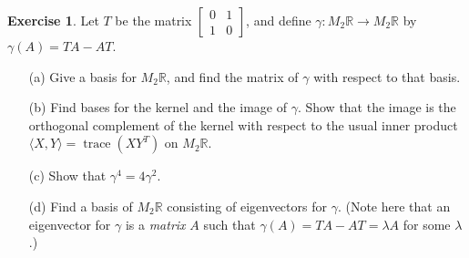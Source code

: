 \documentclass{amsart}
\newcommand{\R}         {{\mathbb{R}}}
\newcommand{\trc}       {\operatorname{trace}}
\newcommand{\bbm}       {\left[\begin{matrix}}
\newcommand{\ebm}       {\end{matrix}\right]}
\newcommand{\gm}        {\gamma}
\newcommand{\lm}        {\lambda}
\newcommand{\ip}[1]     {\langle #1\rangle}
\renewcommand{\:}       {\colon}
\theoremstyle{definition}
\newtheorem{exercise}{Exercise}[section]
\begin{document}
\begin{exercise}
 Let $T$ be the matrix $\bbm 0&1\\1&0\ebm$, and define
 $\gm\:M_2\R\to M_2\R$ by $\gm(A)=TA-AT$.
 \begin{itemize}
  \item[(a)] Give a basis for $M_2\R$, and find the matrix of
  $\gm$ with respect to that basis.
  \item[(b)] Find bases for the kernel and the image of $\gm$.
  Show that the image is the orthogonal complement of the kernel
  with respect to the usual inner product $\ip{X,Y}=\trc(XY^T)$
  on $M_2\R$.
  \item[(c)] Show that $\gm^4=4\gm^2$.
  \item[(d)] Find a basis of $M_2\R$ consisting of eigenvectors
  for $\gm$.  (Note here that an eigenvector for $\gm$ is a
  \emph{matrix} $A$ such that $\gm(A)=TA-AT=\lm A$ for some
  $\lm$.)
 \end{itemize}
\end{exercise}
\end{document}
